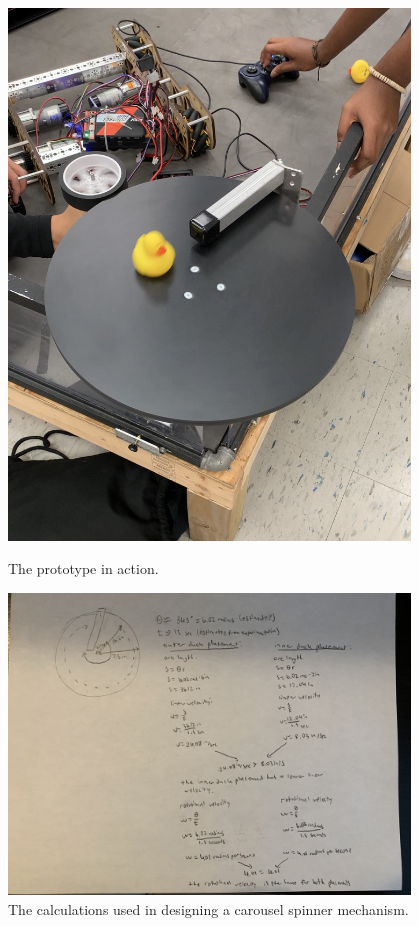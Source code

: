 \begin{figure}[ht]
\centering
\begin{minipage}[b]{.48\textwidth}
  \centering
  \includegraphics[width=0.95\textwidth]{Meetings/September/09-28-21/9-28-21_Hardware_Image3 - Nathan Forrer.jpg}
  \caption{The prototype in action.}
  \label{fig:pic3}
\end{minipage}%
\hfill%
\begin{minipage}[b]{.48\textwidth}
  \centering
  \includegraphics[width=0.95\textwidth]{Meetings/September/09-28-21/9-28-21_Hardware_Image4 - Nathan Forrer.jpg}
  \caption{The calculations used in designing a carousel spinner mechanism.}
  \label{fig:pic4}
\end{minipage}
\end{figure}

